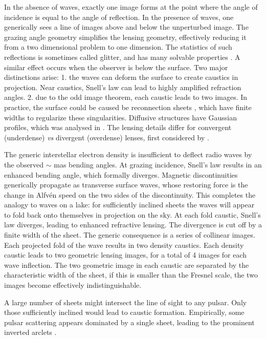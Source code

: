 \documentclass[useAMS,usenatbib]{mn2e}
\begin{document}
In the absence of waves, exactly one image forms at the point
where the angle of incidence is equal to the angle of reflection.  In
the presence of waves, one generically sees a line of images above and
below the unperturbed image.  The grazing angle geometry simplifies
the lensing geometry, effectively reducing it from a two dimensional problem to
one dimension.  The statistics of such reflections is sometimes called
glitter, and has many solvable
properties \citep{LonguetHiggins1960}. 
A similar effect occurs when the
observer is below the surface.  Two major distinctions arise: 1. the
waves can deform the surface to create caustics in projection. Near
caustics, Snell's law can lead to highly amplified refraction
angles.  2. due to the odd image theorem, each caustic leads to two
images.  In practice, the surface could be caused be reconnection
sheets \citep{2015MNRAS.450.3201B}, which have finite widths to
regularize these singularities. Diffusive structures have Gaussian
profiles, which was analysed in \citet{2012MNRAS.421L.132P}.  The
lensing details differ for convergent (underdense) {\it vs} divergent
(overdense) lenses, first considered by \citet{1998ApJ...496..253C}.

The generic interstellar electron density is insufficient to deflect
radio waves by the observed $\sim$ mas bending angles. At grazing
incidence, Snell's law results in an enhanced bending angle, which
formally diverges.  Magnetic discontinuities generically propagate
as transverse surface waves, whose restoring force is the change in Alfv\'en
speed on the two sides of the discontinuity. This completes the
analogy to waves on a lake: for sufficiently inclined sheets the waves
will appear to fold back onto themselves in projection on the sky.  At
each fold caustic, Snell's law diverges, leading to enhanced
refractive lensing.  The divergence is cut off by a finite width of
the sheet.  The generic consequence is a series of collinear images.
Each projected fold of the wave results in two density caustics.  Each density
caustic leads to two geometric lensing images, for a total of 4 images
for each wave inflection.  The two geometric image in each caustic are
separated by the characteristic width of the sheet, if this is smaller
than the Fresnel scale, the two images become effectively
indistinguishable. 

A large number of sheets might intersect the line of sight to any
pulsar. Only those sufficiently inclined would lead to caustic
formation. Empirically, some pulsar scattering appears dominated by a
single sheet, leading to the prominent inverted
arclets \citep{2001ApJ...549L..97S}.
\end{document}
